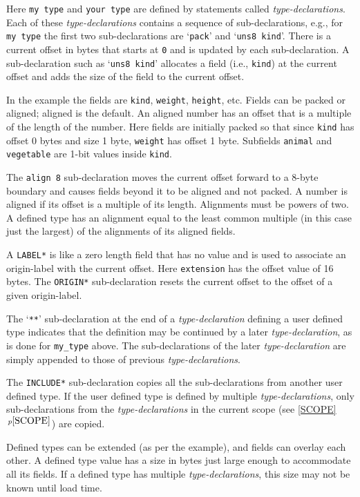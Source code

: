 \documentclass[12pt]{article}
\newcommand{\itemref}[1]{\ref{#1}$\,^{p\pageref{#1}}$}
\begin{document}
Here {\tt my type} and {\tt your type} are defined by
statements called {\em type-declarations}.  Each of these
{\em type-declarations} contains a sequence of sub-declarations, e.g.,
for {\tt my type} the first two sub-declarations are
`{\tt pack}' and `{\tt uns8 kind}'.  There is a current
offset in bytes that starts at {\tt 0} and is updated by each sub-declaration.
A sub-declaration such as `{\tt uns8 kind}' allocates a field
(i.e., {\tt kind})
at the current offset and adds the size of the field to the
current offset.

In the example the fields are {\tt kind}, {\tt weight}, {\tt height}, etc.
Fields can be packed or aligned; aligned is the default.  An aligned number has an offset
that is a multiple of the length of the number.
Here fields are initially packed
so that since {\tt kind} has offset 0 bytes and size 1 byte,
{\tt weight} has offset 1 byte.  Subfields {\tt animal}
and {\tt vegetable} are 1-bit values inside {\tt kind}.

The {\tt align 8} sub-declaration moves the current offset
forward to a 8-byte boundary and causes fields beyond it
to be aligned and not packed.  A number is aligned if
its offset is a multiple of its length.  Alignments must be powers of two.
A defined type has an
alignment equal to the least common multiple (in this case just the
largest) of the
alignments of its aligned fields.

A {\tt *LABEL*} is like a zero length field that has no value and
is used to associate an origin-label with the current offset.
Here {\tt extension} has the offset value of 16 bytes.
The {\tt *ORIGIN*} sub-declaration resets the current offset to the offset
of a given origin-label.

The `{\tt ***}' sub-declaration at the end of a
{\em type-declaration} defining a user defined type indicates
that the definition may be continued by a later {\em type-declaration},
as is done for {\tt my\_type} above.
The sub-declarations of the later {\em type-declaration} are
simply appended to those of previous {\em type-declarations}.

The {\tt *INCLUDE*} sub-declaration copies all the sub-declarations
from another user defined type.
If the user defined type is
defined by multiple {\em type-declarations}, only sub-declarations
from the {\em type-declarations} in the current scope (see \itemref{SCOPE})
are copied.

Defined types can be extended
(as per the example), and fields can overlay each other.
A defined type value has a size in bytes just large enough to
accommodate all its fields.  If a defined type has multiple
{\em type-declarations}, this size may not be known until load time.
\end{document}
